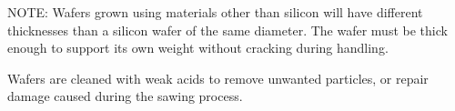 NOTE: Wafers grown using materials other than silicon will have different
thicknesses than a silicon wafer of the same diameter. The wafer must be thick
enough to support its own weight without cracking during handling.


Wafers are cleaned with weak acids to remove unwanted particles, or repair
damage caused during the sawing process. 
